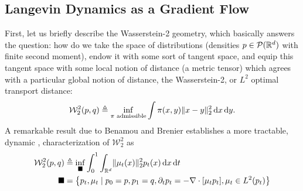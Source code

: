 \documentclass{scrartcl}
\begin{document}
\subsection{Langevin Dynamics as a Gradient Flow}
First, let us briefly describe the Wasserstein-2 geometry, which basically answers the question: how do we take the space of distributions (densities $p \in \mathcal{P}(\mathbb{R}^d)$ with finite second moment), endow it with some sort of tangent space, and equip this tangent space with some local notion of distance (a metric tensor) which agrees with a particular global notion of distance, the Wasserstein-2, or $L^2$ optimal transport distance:
\begin{equation}
\mathcal{W}_2^2(p,q) \triangleq \inf_{\pi \text{  admissible}} \int \pi(x,y)\norm{x - y}_2^2 \d x \d y. 
\end{equation}
A remarkable result due to Benamou and Brenier establishes a more tractable, dynamic \citep{villani2021topics}, characterization of $\mathcal{W}_2^2$ as 
\begin{equation}
    \begin{aligned}
        \mathcal{W}_2^2(p, q) &\triangleq \inf_{\blacksquare} \int_0^1 \int_{\RR^d} \norm{\mu_t(x)}_2^2 p_t(x) \d x \d t\\
        \blacksquare &= \left\{p_t, \mu_t \mid p_0 = p, p_1 = q, \partial_t p_t = - \nabla \cdot [ \mu_t p_t ], \mu_t \in L^2(p_t) \right\}
    \end{aligned}
    \label{eq:bb}
\end{equation}
\end{document}
